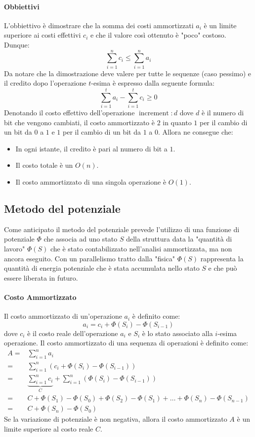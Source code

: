         \paragraph{Obbiettivi} L'obbiettivo è dimostrare che la somma dei costi ammortizzati $a_i$ è un limite superiore ai costi effettivi $c_i$ e che il valore così ottenuto è "poco" costoso. Dunque: $$
            \sum_{i=1}^{n}c_i\leq \sum_{i=1}^{n}a_i
        $$
        Da notare che la dimostrazione deve valere per tutte le sequenze (caso pessimo) e il credito dopo l'operazione $t$-esima è espresso dalla seguente formula: $$
            \sum_{i=1}^{t}a_i-\sum_{i=1}^{t}c_i\geq 0
        $$
        Denotando il costo effettivo dell'operazione $\operatorname{increment}:d$ dove $d$ è il numero di bit che vengono cambiati, il costo ammortizzato è $2$ in quanto $1$ per il cambio di un bit da $0$ a $1$ e $1$ per il cambio di un bit da $1$ a $0$. Allora ne consegue che:\begin{itemize}
            \item In ogni istante, il credito è pari al numero di bit a $1$.
            \item Il costo totale è un $O(n)$.
            \item Il costo ammortizzato di una singola operazione è $O(1)$.
        \end{itemize}
    \subsection{Metodo del potenziale}
        Come anticipato il metodo del potenziale prevede l'utilizzo di una funzione di potenziale $\Phi$ che associa ad uno stato $S$ della struttura data la "quantità di lavoro" $\Phi(S)$ che è stato contabilizzato nell'analisi ammortizzata, ma non ancora eseguito. Con un parallelismo tratto dalla "fisica" $\Phi(S)$ rappresenta la quantità di energia potenziale che è stata accumulata nello stato $S$ e che può essere liberata in futuro.
        \paragraph{Costo Ammortizzato} Il costo ammortizzato di un'operazione $a_i$ è definito come: $$
            a_i=c_i+\Phi(S_i)-\Phi(S_{i-1})
        $$
        dove $c_i$ è il costo reale dell'operazione $a_i$ e $S_i$ è lo stato associato alla $i$-esima operazione. \newline
        Il costo ammortizzato di una sequenza di operazioni è definito come: $$
            \begin{aligned}
                A=&\sum_{i=1}^{n}a_i\\
                =&\sum_{i=1}^{n}\left(c_i+\Phi(S_i)-\Phi(S_{i-1})\right)\\
                =&\underbrace{\sum_{i=1}^{n}c_i}_{C}+\sum_{i=1}^{n}\left(\Phi(S_i)-\Phi(S_{i-1})\right)\\
                =&C+\Phi(S_1)-\Phi(S_0)+\Phi(S_2)-\Phi(S_1)+\ldots+\Phi(S_n)-\Phi(S_{n-1})\\
                =&C+\Phi(S_n)-\Phi(S_0)
            \end{aligned}
        $$
        Se la variazione di potenziale è non negativa, allora il costo ammortizzato $A$ è un limite superiore al costo reale $C$.
